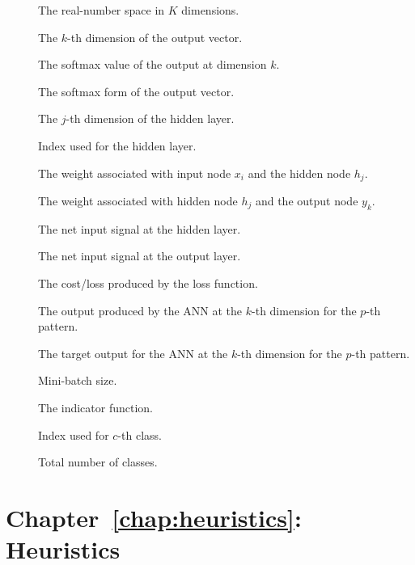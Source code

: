 \begin{description}
	\item [\parbox{2cm}{$\mathbb{R}^{K}$}] The real-number space in $K$ dimensions.
	\item [\parbox{2cm}{$y_{k}$}] The $k$-th dimension of the output vector.
	\item [\parbox{2cm}{$y^{'}_k$}] The softmax value of the output at dimension $k$.
	\item [\parbox{2cm}{$\boldsymbol{y^{'}}$}] The softmax form of the output vector.
	\item [\parbox{2cm}{$h_{j}$}] The $j$-th dimension of the hidden layer.
	\item [\parbox{2cm}{$j$}] Index used for the hidden layer.
	\item [\parbox{2cm}{$v_{i,j}$}] The weight associated with input node $x_{i}$ and the hidden node $h_{j}$.
	\item [\parbox{2cm}{$w_{j,k}$}] The weight associated with hidden node $h_{j}$ and the output node $y_{k}$.
	\item [\parbox{2cm}{$net_{i,h}$}] The net input signal at the hidden layer.
	\item [\parbox{2cm}{$net_{h,y}$}] The net input signal at the output layer.
	\item [\parbox{2cm}{$\epsilon$}] The cost/loss produced by the loss function.
	\item [\parbox{2cm}{$y_{k,p}$}] The output produced by the \acs{ANN} at the $k$-th dimension for the $p$-th pattern.
	\item [\parbox{2cm}{$\hat{y}_{k,p}$}] The target output for the \acs{ANN} at the $k$-th dimension for the $p$-th pattern.
	\item [\parbox{2cm}{$\beta$}] Mini-batch size.
	\item [\parbox{2cm}{$\mathbbm{1}$}] The indicator function.
	\item [\parbox{2cm}{$c$}] Index used for $c$-th class.
	\item [\parbox{2cm}{$C$}] Total number of classes.

\end{description}

\section{Chapter~\ref{chap:heuristics}: Heuristics}
\label{sec:symbols:heuristics}


